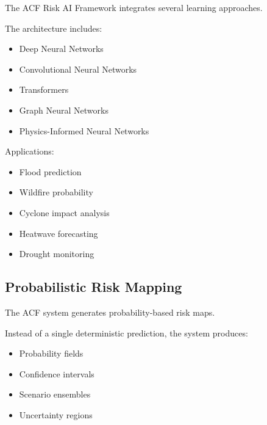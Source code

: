The ACF Risk AI Framework integrates several learning approaches.

The architecture includes:

\begin{itemize}

\item Deep Neural Networks

\item Convolutional Neural Networks

\item Transformers

\item Graph Neural Networks

\item Physics-Informed Neural Networks

\end{itemize}


Applications:

\begin{itemize}

\item Flood prediction

\item Wildfire probability

\item Cyclone impact analysis

\item Heatwave forecasting

\item Drought monitoring

\end{itemize}



\subsection{Probabilistic Risk Mapping}

The ACF system generates probability-based risk maps.

Instead of a single deterministic prediction, the system produces:

\begin{itemize}

\item Probability fields

\item Confidence intervals

\item Scenario ensembles

\item Uncertainty regions

\end{itemize}


